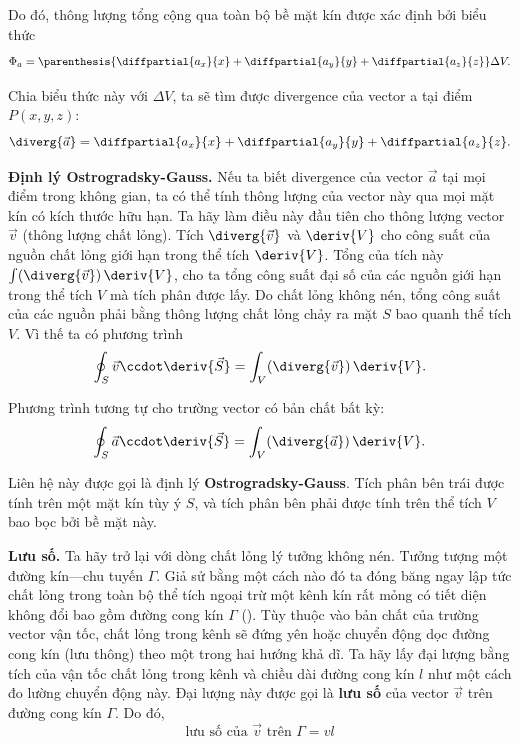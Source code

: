 Do đó, thông lượng tổng cộng qua toàn bộ bề mặt kín được xác định bởi biểu thức
\begin{equation*}
	\Phi_a = \parenthesis{\diffpartial{a_x}{x} + \diffpartial{a_y}{y} + \diffpartial{a_z}{z}}\Delta{V}.
\end{equation*}

\noindent
Chia biểu thức này với $\Delta{V}$, ta sẽ tìm được divergence của vector a tại điểm $P(x, y, z)$:
\begin{equation}\label{eq:1_81}
	\diverg{\vec{a}} = \diffpartial{a_x}{x} + \diffpartial{a_y}{y} + \diffpartial{a_z}{z}.
\end{equation}

\textbf{Định lý Ostrogradsky-Gauss.} Nếu ta biết divergence của vector $\vec{a}$ tại mọi điểm trong không gian, ta có thể tính thông lượng của vector này qua mọi mặt kín có kích thước hữu hạn. Ta hãy làm điều này đầu tiên cho thông lượng vector $\vec{v}$ (thông lượng chất lỏng). Tích $\diverg{\vec{v}}$ và $\deriv{V}$ cho công suất của nguồn chất lỏng giới hạn trong thể tích $\deriv{V}$. Tổng của tích này $\int(\diverg{\vec{v}})\,\deriv{V}$, cho ta tổng công suất đại số của các nguồn giới hạn trong thể tích $V$ mà tích phân được lấy. Do chất lỏng không nén, tổng công suất của các nguồn phải bằng thông lượng chất lỏng chảy ra mặt $S$ bao quanh thể tích $V$. Vì thế ta có phương trình
\begin{equation*}
	\oint_S \vec{v} \ccdot \deriv{\vec{S}} = \int_V (\diverg{\vec{v}})\,\deriv{V}.
\end{equation*}

\noindent
Phương trình tương tự cho trường vector có bản chất bất kỳ:
\begin{equation}\label{eq:1_82}
	\oint_S \vec{a} \ccdot \deriv{\vec{S}} = \int_V (\diverg{\vec{a}})\,\deriv{V}.
\end{equation}

\noindent
Liên hệ này được gọi là định lý \textbf{Ostrogradsky-Gauss}. Tích phân bên trái được tính trên một mặt kín tùy ý $S$, và tích phân bên phải được tính trên thể tích $V$ bao bọc bởi bề mặt này.

\textbf{Lưu số.} Ta hãy trở lại với dòng chất lỏng lý tưởng không nén. Tưởng tượng một đường kín---chu tuyến $\Gamma$. Giả sử bằng một cách nào đó ta đóng băng ngay lập tức chất lỏng trong toàn bộ thể tích ngoại trừ một kênh kín rất mỏng có tiết diện không đổi bao gồm đường cong kín $\Gamma$ (). Tùy thuộc vào bản chất của trường vector vận tốc, chất lỏng trong kênh sẽ đứng yên hoặc chuyển động dọc đường cong kín (lưu thông) theo một trong hai hướng khả dĩ. Ta hãy lấy đại lượng bằng tích của vận tốc chất lỏng trong kênh và chiều dài đường cong kín $l$ như một cách đo lường chuyển động này. Đại lượng này được gọi là \textbf{lưu số} của vector $\vec{v}$ trên đường cong kín $\Gamma$. Do đó,
\begin{equation*}
	\text{lưu số của $\vec{v}$ trên $\Gamma$} = vl
\end{equation*}

